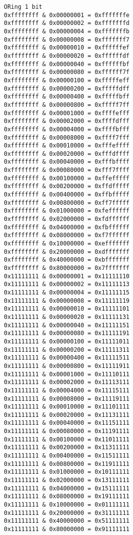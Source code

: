 \documentclass[11pt]{article}
\begin{document}
\begin{verbatim}
ORing 1 bit
0xffffffff & 0x00000001 = 0xfffffffe
0xffffffff & 0x00000002 = 0xfffffffd
0xffffffff & 0x00000004 = 0xfffffffb
0xffffffff & 0x00000008 = 0xfffffff7
0xffffffff & 0x00000010 = 0xffffffef
0xffffffff & 0x00000020 = 0xffffffdf
0xffffffff & 0x00000040 = 0xffffffbf
0xffffffff & 0x00000080 = 0xffffff7f
0xffffffff & 0x00000100 = 0xfffffeff
0xffffffff & 0x00000200 = 0xfffffdff
0xffffffff & 0x00000400 = 0xfffffbff
0xffffffff & 0x00000800 = 0xfffff7ff
0xffffffff & 0x00001000 = 0xffffefff
0xffffffff & 0x00002000 = 0xffffdfff
0xffffffff & 0x00004000 = 0xffffbfff
0xffffffff & 0x00008000 = 0xffff7fff
0xffffffff & 0x00010000 = 0xfffeffff
0xffffffff & 0x00020000 = 0xfffdffff
0xffffffff & 0x00040000 = 0xfffbffff
0xffffffff & 0x00080000 = 0xfff7ffff
0xffffffff & 0x00100000 = 0xffefffff
0xffffffff & 0x00200000 = 0xffdfffff
0xffffffff & 0x00400000 = 0xffbfffff
0xffffffff & 0x00800000 = 0xff7fffff
0xffffffff & 0x01000000 = 0xfeffffff
0xffffffff & 0x02000000 = 0xfdffffff
0xffffffff & 0x04000000 = 0xfbffffff
0xffffffff & 0x08000000 = 0xf7ffffff
0xffffffff & 0x10000000 = 0xefffffff
0xffffffff & 0x20000000 = 0xdfffffff
0xffffffff & 0x40000000 = 0xbfffffff
0xffffffff & 0x80000000 = 0x7fffffff
0x11111111 & 0x00000001 = 0x11111110
0x11111111 & 0x00000002 = 0x11111113
0x11111111 & 0x00000004 = 0x11111115
0x11111111 & 0x00000008 = 0x11111119
0x11111111 & 0x00000010 = 0x11111101
0x11111111 & 0x00000020 = 0x11111131
0x11111111 & 0x00000040 = 0x11111151
0x11111111 & 0x00000080 = 0x11111191
0x11111111 & 0x00000100 = 0x11111011
0x11111111 & 0x00000200 = 0x11111311
0x11111111 & 0x00000400 = 0x11111511
0x11111111 & 0x00000800 = 0x11111911
0x11111111 & 0x00001000 = 0x11110111
0x11111111 & 0x00002000 = 0x11113111
0x11111111 & 0x00004000 = 0x11115111
0x11111111 & 0x00008000 = 0x11119111
0x11111111 & 0x00010000 = 0x11101111
0x11111111 & 0x00020000 = 0x11131111
0x11111111 & 0x00040000 = 0x11151111
0x11111111 & 0x00080000 = 0x11191111
0x11111111 & 0x00100000 = 0x11011111
0x11111111 & 0x00200000 = 0x11311111
0x11111111 & 0x00400000 = 0x11511111
0x11111111 & 0x00800000 = 0x11911111
0x11111111 & 0x01000000 = 0x10111111
0x11111111 & 0x02000000 = 0x13111111
0x11111111 & 0x04000000 = 0x15111111
0x11111111 & 0x08000000 = 0x19111111
0x11111111 & 0x10000000 = 0x01111111
0x11111111 & 0x20000000 = 0x31111111
0x11111111 & 0x40000000 = 0x51111111
0x11111111 & 0x80000000 = 0x91111111
\end{verbatim}
\end{document}

